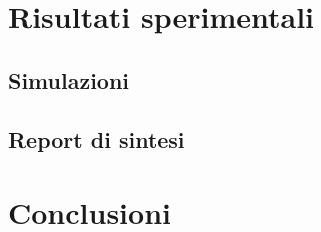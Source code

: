 \documentclass{article}
\begin{document}
\pagebreak
\section{Risultati sperimentali}
\subsection{Simulazioni}
\subsection{Report di sintesi}

\pagebreak
\section{Conclusioni}
\end{document}
